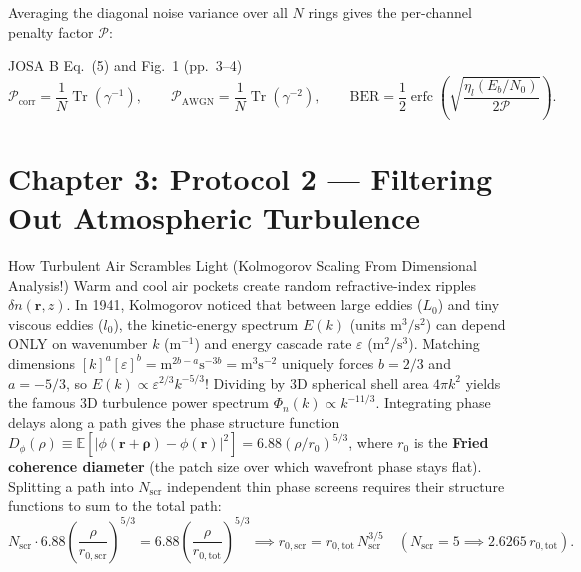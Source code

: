 \documentclass[10pt,letterpaper]{article}
\newcommand{\abs}[1]{\lvert #1 \rvert}
\numberwithin{equation}{section}
\begin{document}
Averaging the diagonal noise variance over all $N$ rings gives the per-channel penalty factor $\mathcal{P}$:

\begin{paperhit}{JOSA B Eq.~(5) and Fig.~1 (pp.~3--4)}
\[
  \mathcal{P}_{\mathrm{corr}} = \frac{1}{N}\operatorname{Tr}(\gamma^{-1}), \qquad
  \mathcal{P}_{\mathrm{AWGN}} = \frac{1}{N}\operatorname{Tr}(\gamma^{-2}), \qquad
  \mathrm{BER} = \frac{1}{2}\operatorname{erfc}\!\left(\sqrt{\frac{\eta_l(E_b/N_0)}{2\mathcal{P}}}\right).
\]
\end{paperhit}

\section{Chapter 3: Protocol 2 --- Filtering Out Atmospheric Turbulence}
\label{sec:b_c3}

\begin{foundationbox}{How Turbulent Air Scrambles Light (Kolmogorov Scaling From Dimensional Analysis!)}
Warm and cool air pockets create random refractive-index ripples $\delta n(\mathbf{r},z)$. In 1941, Kolmogorov noticed that between large eddies ($L_0$) and tiny viscous eddies ($l_0$), the kinetic-energy spectrum $E(k)$ (units $\mathrm{m}^3/\mathrm{s}^2$) can depend ONLY on wavenumber $k$ ($\mathrm{m}^{-1}$) and energy cascade rate $\varepsilon$ ($\mathrm{m}^2/\mathrm{s}^3$). Matching dimensions $[k]^a[\varepsilon]^b = \mathrm{m}^{2b-a}\mathrm{s}^{-3b} = \mathrm{m}^3\mathrm{s}^{-2}$ uniquely forces $b = 2/3$ and $a = -5/3$, so $E(k) \propto \varepsilon^{2/3}k^{-5/3}$! Dividing by 3D spherical shell area $4\pi k^2$ yields the famous 3D turbulence power spectrum $\Phi_n(k) \propto k^{-11/3}$. Integrating phase delays along a path gives the phase structure function $D_\phi(\rho) \equiv \mathbb{E}[\abs{\phi(\mathbf{r}+\boldsymbol{\rho})-\phi(\mathbf{r})}^2] = 6.88(\rho/r_0)^{5/3}$, where $r_0$ is the \textbf{Fried coherence diameter} (the patch size over which wavefront phase stays flat). Splitting a path into $N_{\mathrm{scr}}$ independent thin phase screens requires their structure functions to sum to the total path:
\[
  N_{\mathrm{scr}}\cdot 6.88\left(\frac{\rho}{r_{0,\mathrm{scr}}}\right)^{5/3} = 6.88\left(\frac{\rho}{r_{0,\mathrm{tot}}}\right)^{5/3} \implies r_{0,\mathrm{scr}} = r_{0,\mathrm{tot}}\,N_{\mathrm{scr}}^{3/5} \quad (N_{\mathrm{scr}}=5 \implies 2.6265\,r_{0,\mathrm{tot}}).
\]
\end{foundationbox}
\end{document}
